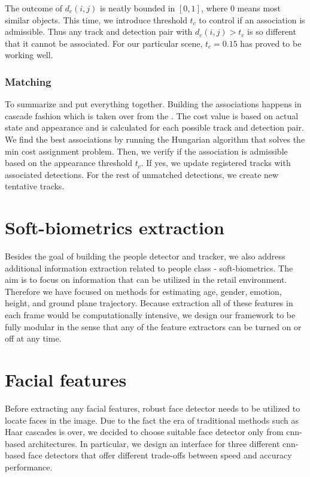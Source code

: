             The outcome of $d_c(i,j)$ is neatly bounded in $[0,1]$, where $0$ means most similar objects. This time, we introduce threshold $t_c$ to control if an association is admissible. Thus any track and detection pair with $d_c(i,j) > t_c$ is so different that it cannot be associated. For our particular scene, $t_c = 0.15$ has proved to be working well.

        \subsubsection{Matching}
           To summarize and put everything together. Building the associations happens in cascade fashion which is taken over from the \cite{wojke2017simple}. The cost value is based on actual state and appearance and is calculated for each possible track and detection pair. We find the best associations by running the Hungarian algorithm \cite{jonker1987shortest} that solves the min cost assignment problem. Then, we verify if the association is admissible based on the appearance threshold $t_c$. If yes, we update registered tracks with associated detections. For the rest of unmatched detections, we create new tentative tracks.
            
\section{Soft-biometrics extraction}
    Besides the goal of building the people detector and tracker, we also address additional information extraction related to people class - soft-biometrics. The aim is to focus on information that can be utilized in the retail environment. Therefore we have focused on methods for estimating age, gender, emotion, height, and ground plane trajectory. Because extraction all of these features in each frame would be computationally intensive, we design our framework to be fully modular in the sense that any of the feature extractors can be turned on or off at any time.
    
    \section{Facial features}
        Before extracting any facial features, robust face detector needs to be utilized to locate faces in the image. Due to the fact the era of traditional methods such as Haar cascades \cite{viola2001rapid} is over, we decided to choose suitable face detector only from \gls{cnn}-based architectures. In particular, we design an interface for three different \gls{cnn}-based face detectors that offer different trade-offs between speed and accuracy performance. 

